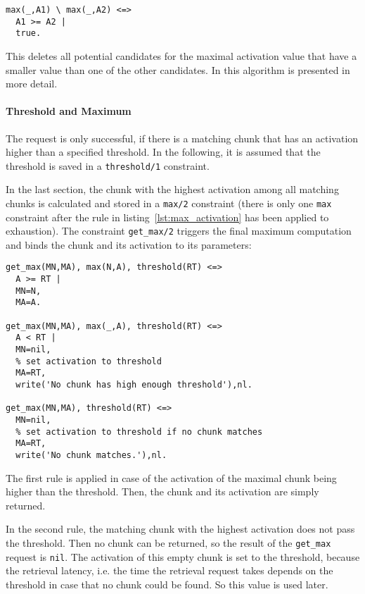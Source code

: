 \begin{lstlisting}[caption={Calculate highest activation of all matching chunks}, label=lst:max_activation]
max(_,A1) \ max(_,A2) <=> 
  A1 >= A2 |
  true.
\end{lstlisting}

This deletes all potential candidates for the maximal activation value that have a smaller value than one of the other candidates. In \cite[19\psqq]{fru_chr_book_2009} this algorithm is presented in more detail.

\paragraph{Threshold and Maximum}

The request is only successful, if there is a matching chunk that has an activation higher than a specified threshold. In the following, it is assumed that the threshold is saved in a \lstinline|threshold/1| constraint.

In the last section, the chunk with the highest activation among all matching chunks is calculated and stored in a \lstinline|max/2| constraint (there is only one \lstinline|max| constraint after the rule in listing~\ref{lst:max_activation} has been applied to exhaustion). The constraint \lstinline|get_max/2| triggers the final maximum computation and binds the chunk and its activation to its parameters:

\begin{lstlisting}
get_max(MN,MA), max(N,A), threshold(RT) <=> 
  A >= RT | 
  MN=N,
  MA=A.
  
get_max(MN,MA), max(_,A), threshold(RT) <=> 
  A < RT | 
  MN=nil,
  % set activation to threshold
  MA=RT,
  write('No chunk has high enough threshold'),nl.
  
get_max(MN,MA), threshold(RT) <=>
  MN=nil,
  % set activation to threshold if no chunk matches
  MA=RT,
  write('No chunk matches.'),nl.
\end{lstlisting}

The first rule is applied in case of the activation of the maximal chunk being higher than the threshold. Then, the chunk and its activation are simply returned.

In the second rule, the matching chunk with the highest activation does not pass the threshold. Then no chunk can be returned, so the result of the \lstinline|get_max| request is \lstinline|nil|. The activation of this empty chunk is set to the threshold, because the retrieval latency, i.e. the time the retrieval request takes depends on the threshold in case that no chunk could be found. So this value is used later.

